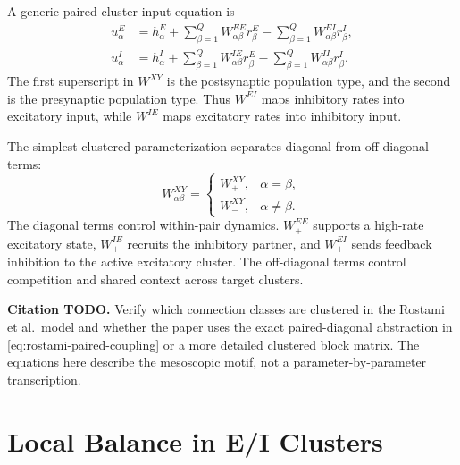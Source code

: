 A generic paired-cluster input equation is
%
\begin{align}
  u_{\alpha}^{E}
  &=
  h_{\alpha}^{E}
  +
  \sum_{\beta=1}^{Q}W_{\alpha\beta}^{EE}r_{\beta}^{E}
  -
  \sum_{\beta=1}^{Q}W_{\alpha\beta}^{EI}r_{\beta}^{I},
  \label{eq:rostami-e-input}\\
  u_{\alpha}^{I}
  &=
  h_{\alpha}^{I}
  +
  \sum_{\beta=1}^{Q}W_{\alpha\beta}^{IE}r_{\beta}^{E}
  -
  \sum_{\beta=1}^{Q}W_{\alpha\beta}^{II}r_{\beta}^{I}.
  \label{eq:rostami-i-input}
\end{align}
%
The first superscript in $W^{XY}$ is the postsynaptic population type, and the second is the presynaptic population type. Thus $W^{EI}$ maps inhibitory rates into excitatory input, while $W^{IE}$ maps excitatory rates into inhibitory input.

The simplest clustered parameterization separates diagonal from off-diagonal terms:
%
\begin{equation}
  W_{\alpha\beta}^{XY}
  =
  \begin{cases}
    W_+^{XY}, & \alpha=\beta,\\
    W_-^{XY}, & \alpha\ne\beta.
  \end{cases}
  \label{eq:rostami-paired-coupling}
\end{equation}
%
The diagonal terms control within-pair dynamics. $W_+^{EE}$ supports a high-rate excitatory state, $W_+^{IE}$ recruits the inhibitory partner, and $W_+^{EI}$ sends feedback inhibition to the active excitatory cluster. The off-diagonal terms control competition and shared context across target clusters.

\noindent\textbf{Citation TODO.} Verify which connection classes are clustered in the Rostami et al.\ model and whether the paper uses the exact paired-diagonal abstraction in \eqref{eq:rostami-paired-coupling} or a more detailed clustered block matrix. The equations here describe the mesoscopic motif, not a parameter-by-parameter transcription.

\section{Local Balance in E/I Clusters}
\label{sec:rostami-local-balance-ei-clusters}


